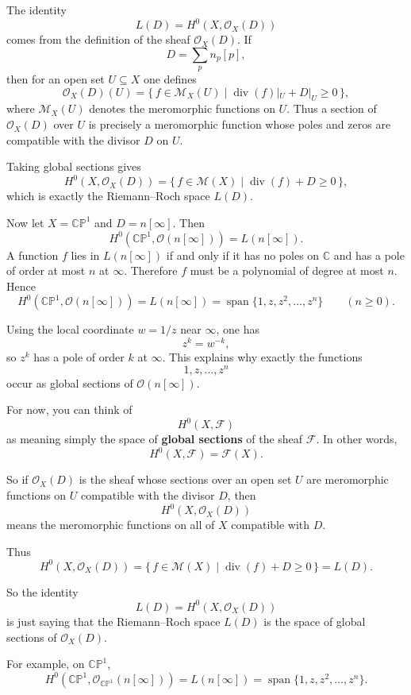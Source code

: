 \documentclass[11pt,openany]{article}
\renewcommand{\emph}[1]{\textbf{#1}}
\newcommand{\CP}{\mathbb{CP}}
\newcommand{\Div}{\operatorname{Div}}
\renewcommand{\div}{\operatorname{div}}
\begin{document}
\newpage
The identity
\[
L(D)=H^0(X,\mathcal O_X(D))
\]
comes from the definition of the sheaf $\mathcal O_X(D)$. If
\[
D=\sum_p n_p[p],
\]
then for an open set $U\subseteq X$ one defines
\[
\mathcal O_X(D)(U)
=
\{\,f\in \mathcal M_X(U)\mid \operatorname{div}(f)|_U+D|_U\ge 0\,\},
\]
where $\mathcal M_X(U)$ denotes the meromorphic functions on $U$. Thus a section of $\mathcal O_X(D)$ over $U$ is precisely a meromorphic function whose poles and zeros are compatible with the divisor $D$ on $U$.

Taking global sections gives
\[
H^0(X,\mathcal O_X(D))
=
\{\,f\in \mathcal M(X)\mid \operatorname{div}(f)+D\ge 0\,\},
\]
which is exactly the Riemann--Roch space $L(D)$.

Now let $X=\mathbb{CP}^1$ and $D=n[\infty]$. Then
\[
H^0(\mathbb{CP}^1,\mathcal O(n[\infty]))
=
L(n[\infty]).
\]
A function $f$ lies in $L(n[\infty])$ if and only if it has no poles on $\mathbb C$ and has a pole of order at most $n$ at $\infty$. Therefore $f$ must be a polynomial of degree at most $n$. Hence
\[
H^0(\mathbb{CP}^1,\mathcal O(n[\infty]))
=
L(n[\infty])
=
\operatorname{span}\{1,z,z^2,\dots,z^n\}
\qquad (n\ge 0).
\]

Using the local coordinate $w=1/z$ near $\infty$, one has
\[
z^k=w^{-k},
\]
so $z^k$ has a pole of order $k$ at $\infty$. This explains why exactly the functions
\[
1,z,\dots,z^n
\]
occur as global sections of $\mathcal O(n[\infty])$.


\newpage
For now, you can think of
\[
H^0(X,\mathcal F)
\]
as meaning simply the space of \emph{global sections} of the sheaf $\mathcal F$. In other words,
\[
H^0(X,\mathcal F)=\mathcal F(X).
\]

So if $\mathcal O_X(D)$ is the sheaf whose sections over an open set $U$ are meromorphic functions on $U$ compatible with the divisor $D$, then
\[
H^0(X,\mathcal O_X(D))
\]
means the meromorphic functions on all of $X$ compatible with $D$.

Thus
\[
H^0(X,\mathcal O_X(D))
=
\{\,f\in\mathcal M(X)\mid \operatorname{div}(f)+D\ge 0\,\}
=
L(D).
\]

So the identity
\[
L(D)=H^0(X,\mathcal O_X(D))
\]
is just saying that the Riemann--Roch space $L(D)$ is the space of global sections of $\mathcal O_X(D)$.

For example, on $\mathbb{CP}^1$,
\[
H^0(\mathbb{CP}^1,\mathcal O_{\mathbb{CP}^1}(n[\infty]))
=
L(n[\infty])
=
\operatorname{span}\{1,z,z^2,\dots,z^n\}.
\]

\end{document}
